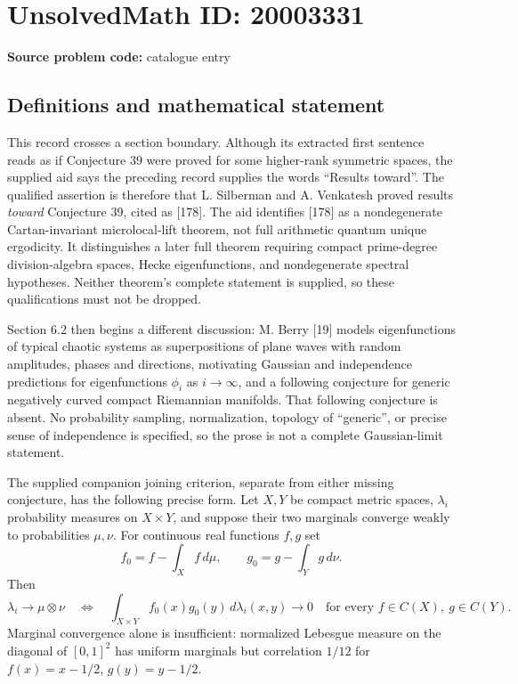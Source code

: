 \documentclass[11pt]{article}
\begin{document}
\section*{UnsolvedMath ID: 20003331}
\textbf{Source problem code:} catalogue entry
\subsection{Definitions and mathematical statement}
This record crosses a section boundary. Although its extracted first sentence reads as if Conjecture 39 were proved for some higher-rank symmetric spaces, the supplied aid says the preceding record supplies the words ``Results toward''. The qualified assertion is therefore that L. Silberman and A. Venkatesh proved results \emph{toward} Conjecture 39, cited as [178]. The aid identifies [178] as a nondegenerate Cartan-invariant microlocal-lift theorem, not full arithmetic quantum unique ergodicity. It distinguishes a later full theorem requiring compact prime-degree division-algebra spaces, Hecke eigenfunctions, and nondegenerate spectral hypotheses. Neither theorem's complete statement is supplied, so these qualifications must not be dropped.

Section 6.2 then begins a different discussion: M. Berry [19] models eigenfunctions of typical chaotic systems as superpositions of plane waves with random amplitudes, phases and directions, motivating Gaussian and independence predictions for eigenfunctions $\phi_i$ as $i\to\infty$, and a following conjecture for generic negatively curved compact Riemannian manifolds. That following conjecture is absent. No probability sampling, normalization, topology of ``generic'', or precise sense of independence is specified, so the prose is not a complete Gaussian-limit statement.

The supplied companion joining criterion, separate from either missing conjecture, has the following precise form. Let $X,Y$ be compact metric spaces, $\lambda_i$ probability measures on $X\times Y$, and suppose their two marginals converge weakly to probabilities $\mu,\nu$. For continuous real functions $f,g$ set
\[
 f_0=f-\int_X f\,d\mu,\qquad g_0=g-\int_Y g\,d\nu.
\]
Then
\[
 \lambda_i\longrightarrow\mu\otimes\nu
 \quad\Longleftrightarrow\quad
 \int_{X\times Y} f_0(x)g_0(y)\,d\lambda_i(x,y)\longrightarrow0
 \quad\text{for every }f\in C(X),\ g\in C(Y).
\]
Marginal convergence alone is insufficient: normalized Lebesgue measure on the diagonal of $[0,1]^2$ has uniform marginals but correlation $1/12$ for $f(x)=x-1/2$, $g(y)=y-1/2$.
\end{document}
